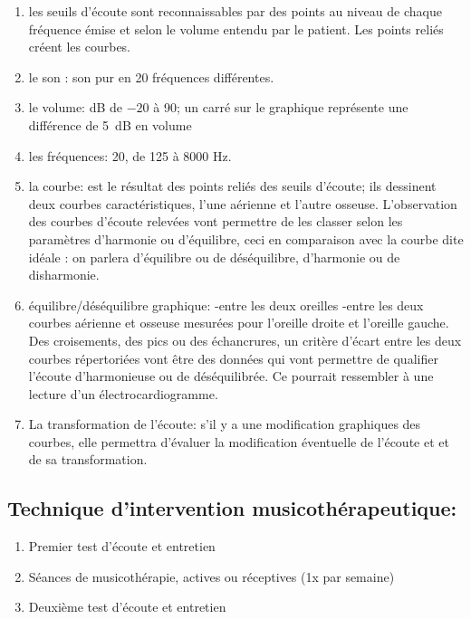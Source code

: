  
  \begin{enumerate}
 	\item les seuils d'écoute sont reconnaissables par des points au niveau de 
          chaque fréquence émise et selon le volume entendu par le patient. Les points reliés créent les courbes.
 	\item le son : son pur en 20 fréquences différentes.  
 	\item le volume: dB de $-20$ à 90; un carré sur le graphique représente une différence de \SI{5}{\dB} en
 		volume 
 	\item les fréquences: 20, de 125 à 8000 Hz. 
 	\item la courbe: est le résultat des points reliés des seuils
          d'écoute; ils 
          dessinent deux courbes caractéristiques, l'une aérienne et l'autre osseuse.
          L'observation des courbes d'écoute relevées vont permettre
          de les classer selon les paramètres d'harmonie ou
          d'équilibre, ceci 
 	en comparaison avec la courbe dite idéale : on parlera
        d'équilibre ou de
 	déséquilibre, d'harmonie ou de disharmonie.
        
      \item équilibre/déséquilibre graphique:
        -entre les deux oreilles
        -entre les deux courbes aérienne et osseuse mesurées pour
        l'oreille droite et l'oreille gauche.
        Des croisements, des pics ou des échancrures, un critère
        d'écart
        entre les deux courbes répertoriées vont être des
        données qui vont permettre de
        qualifier l'écoute d'harmonieuse ou de
        déséquilibrée. Ce pourrait ressembler à une lecture d'un
        électrocardiogramme.
        
 	\item La transformation de l'écoute: s'il y a une modification
          graphiques des courbes, elle 
          permettra d'évaluer la modification éventuelle de l'écoute et
          et de sa transformation.
          
\end{enumerate}
 
 	
        \subsection{Technique d'intervention musicothérapeutique:}
\begin{enumerate}
        \item Premier test d'écoute et entretien
        \item Séances de musicothérapie, actives ou réceptives (1x par semaine)
        \item Deuxième test d'écoute et entretien
\end{enumerate}
        
